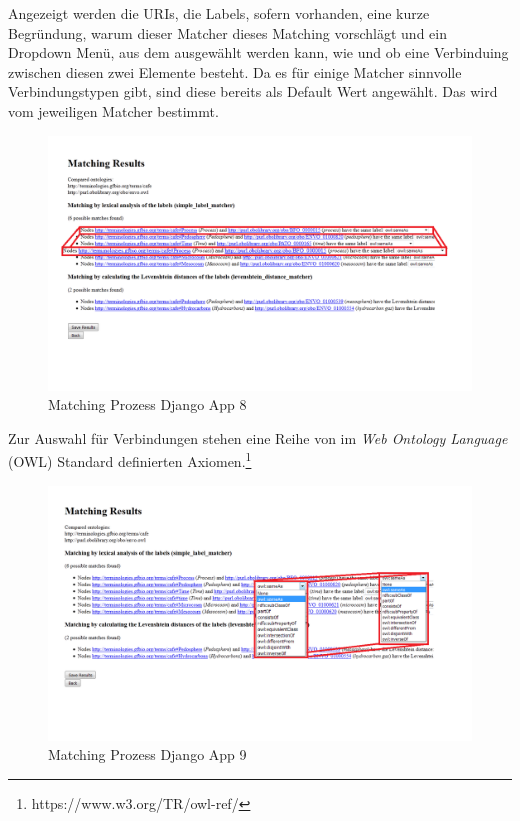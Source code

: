 		\pagebreak[4]
		Angezeigt werden die URIs, die Labels, sofern vorhanden, eine kurze
		Begründung, warum dieser Matcher dieses Matching vorschlägt und ein Dropdown
		Menü, aus dem ausgewählt werden kann, wie und ob eine Verbinduing zwischen
		diesen zwei Elemente besteht. Da es für einige Matcher sinnvolle
		Verbindungstypen gibt, sind diese bereits als Default Wert angewählt. Das
		wird vom jeweiligen Matcher bestimmt.
		\begin{figure}[h!]
		\centering
		\includegraphics[width=1.0\textwidth]{pics/SimpleOntologyMatcher-Process7.png}
		\caption{Matching Prozess Django App 8}
		\label{fig11}
		\end{figure}
		
		\pagebreak[4]
		Zur Auswahl für Verbindungen stehen eine Reihe von im \textit{Web Ontology
		Language} (OWL) Standard definierten
		Axiomen.\footnote{https://www.w3.org/TR/owl-ref/}
		\begin{figure}[h!]
		\centering
		\includegraphics[width=1.0\textwidth]{pics/SimpleOntologyMatcher-Process9.png}
		\caption{Matching Prozess Django App 9}
		\label{fig12}
		\end{figure}
		
